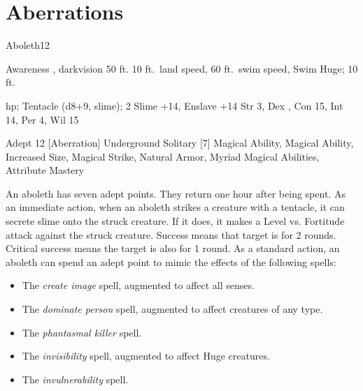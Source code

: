 \section{Aberrations}

    \begin{monsection}{Aboleth}{12}
        \begin{spellcontent}
            \begin{spelltargetinginfo}
                \pari {} Awareness , darkvision 50 ft.
                \pari {} 10 ft.\ land speed, 60 ft.\ swim speed, Swim 
                \pari {} Huge;  10 ft.
            \end{spelltargetinginfo}
            \begin{spelleffects}
                \pari {} hp;  
                \pari {} Tentacle  (d8+9, slime);  2
                \pari {} Slime +14, Enslave +14
                \pari {} Str 3, Dex , Con 15, Int 14, Per 4, Wil 15
            \end{spelleffects}
        \end{spellcontent}
        \begin{spellfooter}
            \pari {} Adept 12 [Aberration]
            \pari {} Underground
            \pari {} Solitary
            \pari {} [7] Magical Ability, Magical Ability, Increased Size, Magical Strike, Natural Armor, Myriad Magical Abilities, Attribute Mastery
        \end{spellfooter}
    \end{monsection}
     An aboleth has seven adept points.
    They return one hour after being spent.
     As an immediate action, when an aboleth strikes a creature with a tentacle, it can secrete slime onto the struck creature.
    If it does, it makes a Level vs. Fortitude attack against the struck creature.
    Success means that target is \sickened for 2 rounds.
    Critical success means the target is also \nauseated for 1 round.
     As a standard action, an aboleth can spend an adept point to mimic the effects of the following spells:
    \begin{itemize}
        \item The \textit{create image} spell, augmented to affect all senses.
        \item The \textit{dominate person} spell, augmented to affect creatures of any type.
        \item The \textit{phantasmal killer} spell.
        \item The \textit{invisibility} spell, augmented to affect Huge creatures.
        \item The \textit{invulnerability} spell.
    \end{itemize}
